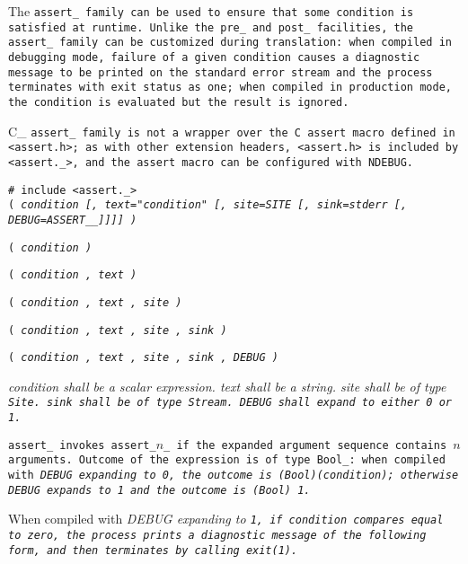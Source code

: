 The \tt{assert_} family can be used to ensure
that some condition is satisfied at runtime.
Unlike the \tt{pre_} and \tt{post_} facilities,
the \tt{assert_} family can be customized during translation:
when compiled in debugging mode, failure of a given condition causes
a diagnostic message to be printed on the standard error stream and the
process terminates with exit status as one; when compiled in production mode,
the condition is evaluated but the result is ignored.

\note C\_ \tt{assert_} family is not a wrapper over
the C \tt{assert} macro defined in \tt{<assert.h>};
as with other extension headers, \tt{<assert.h>} is included by \tt{<assert._>},
and the \tt{assert} macro can be configured with \tt{NDEBUG}.


\tt{# include <assert._>}\\

\s\s\s
 \tt{(} \it{condition}
[\tt{,} \it{text}\tt{="}\it{condition}\tt{"}
[\tt{,} \it{site}\tt{=SITE}
[\tt{,} \it{sink}\tt{=stderr}
[\tt{,} \it{DEBUG}\tt{=ASSERT__}]]]]
 \tt{)}

\s\tt{(}
\it{condition} \tt{)}

\s\tt{(}
\it{condition} \tt{,}
\it{text} \tt{)}

\s\tt{(}
\it{condition} \tt{,}
\it{text} \tt{,}
\it{site} \tt{)}

\s\tt{(}
\it{condition} \tt{,}
\it{text} \tt{,}
\it{site} \tt{,}
\it{sink} \tt{)}

\s\tt{(}
\it{condition} \tt{,}
\it{text} \tt{,}
\it{site} \tt{,}
\it{sink} \tt{,}
\it{DEBUG} \tt{)}


\it{condition} shall be a scalar expression.
\it{text} shall be a string.
\it{site} shall be of type \tt{Site}.
\it{sink} shall be of type \tt{Stream}.
\it{DEBUG} shall expand to either \tt{0} or \tt{1}.


\tt{assert_} invokes \tt{assert_}$n$\_ if the
expanded argument sequence contains $n$ arguments.
Outcome of the expression is of type \tt{Bool_}:
when compiled with \it{DEBUG} expanding to \tt{0},
the outcome is \tt{(Bool)(}\it{condition}\tt{)};
otherwise \it{DEBUG} expands to \tt{1} and the outcome is \tt{(Bool) 1}.

When compiled with \it{DEBUG} expanding to \tt{1}, if \it{condition} compares
equal to zero, the process prints a diagnostic message of the following form,
and then terminates by calling \tt{exit(1)}.\\

